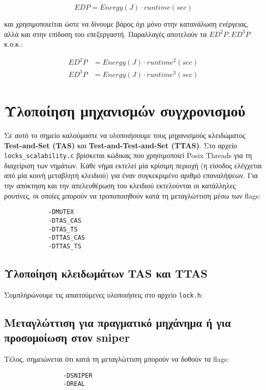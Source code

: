 \documentclass[12pt,a4paper]{article}
\begin{document}
			\[
				EDP = Energy(J) \cdot runtime(sec)
			\]
			
			και χρησιμοποιείται ώστε να δίνουμε βάρος όχι μόνο στην κατανάλωση ενέργειας, αλλά και στην επίδοση του επεξεργαστή. Παραλλαγές αποτελούν τα $ED^2P, ED^3P$ κ.ο.κ.:
			
			\begin{align*}
				ED^2P &= Energy(J) \cdot runtime^2(sec) \\
				ED^3P &= Energy(J) \cdot runtime^3(sec)
			\end{align*}
	
	\section{Υλοποίηση μηχανισμών συγχρονισμού}
	
		Σε αυτό το σημείο καλούμαστε να υλοποιήσουμε τους μηχανισμούς κλειδώματος \textbf{Test-and-Set (TAS)} και \textbf{Test-and-Test-and-Set (TTAS)}. Στο αρχείο \verb|locks_scalability.c| βρίσκεται κώδικας που χρησιμοποιεί Posix Threads για τη διαχείριση των νημάτων. Κάθε νήμα εκτελεί μία κρίσιμη περιοχή (η είσοδος ελέγχεται από μία κοινή μεταβλητή κλειδιού) για έναν συγκεκριμένο αριθμό επαναλήψεων. Για την απόκτηση και την απελευθέρωση του κλειδιού εκτελούνται οι κατάλληλες ρουτίνες, οι οποίες μπορούν να τροποποιηθούν κατά τη μεταγλώττιση μέσω των flags:
		
		\begin{verbatim}
			-DMUTEX
			-DTAS_CAS
			-DTAS_TS
			-DTTAS_CAS 
			-DTTAS_TS
		\end{verbatim}
		
		\subsection{Υλοποίηση κλειδωμάτων TAS και TTAS}
			Συμπληρώνουμε τις απαιτούμενες υλοποιήσεις στο αρχείο \verb|lock.h|:
			
			
		
		\subsection{Μεταγλώττιση για πραγματικό μηχάνημα ή για προσομοίωση στον sniper}
			Tέλος, σημειώνεται ότι κατά τη μεταγλώττιση μπορούν να δοθούν τα flags:
			
			\begin{verbatim}
				-DSNIPER
				-DREAL
			\end{verbatim}
		
\end{document}
